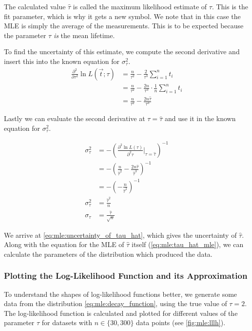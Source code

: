The calculated value \( \hat{\tau} \) is called the maximum likelihood estimate of \( \tau \). This is the fit parameter, which is why it gets a new symbol. We note that in this case the MLE is simply the average of the measurements. This is to be expected because the parameter \( \tau \) \emph{is} the mean lifetime.

To find the uncertainty of this estimate, we compute the second derivative and insert this into the known equation for $\sigma_\tau^2$.
\begin{align}
    \frac{\partial^2}{\partial \tau^2} \ln L(\vec{t} ; \tau) &= \frac{n}{\tau^2} - \frac{2}{\tau^3} \sum \limits_{i = 1}^{n} t_i \\
    &= \frac{n}{\tau^2} - \frac{2 n}{\tau^3} \cdot \frac{1}{n} \sum \limits_{i = 1}^{n} t_i \\
    &= \frac{n}{\tau^2} - \frac{2 n \hat{\tau}}{\tau^3}
\end{align}

Lastly we can evaluate the second derivative at $\tau = \hat{\tau}$ and use it in the known equation for $\sigma_\tau^2$.

\begin{align}
    \sigma_\tau^2 &= - \left(\frac{\partial^2 \ln L(\tau)}{\partial^2 \tau} \Big|_{\tau = \hat{\tau}} \right)^{-1} \\
    &= - \left( \frac{n}{\hat{\tau}^2} - \frac{2 n \hat{\tau}}{\hat{\tau}^3} \right)^{-1} \\
    &= - \left(- \frac{n}{\hat{\tau}^2} \right)^{-1} \\
    \sigma_\tau^2 &= \frac{\hat{\tau}^2}{n} \\
    \sigma_\tau &= \frac{\hat{\tau}}{\sqrt{n}}
    \label{eq:mle:uncertainty_of_tau_hat}
\end{align}

We arrive at \autoref{eq:mle:uncertainty_of_tau_hat}, which gives the uncertainty of \( \hat{\tau} \). Along with the equation for the MLE of \( \hat{\tau} \) itself (\autoref{eq:mle:tau_hat_mle}), we can calculate the parameters of the distribution which produced the data.

\subsubsection{Plotting the Log-Likelihood Function and its Approximation}

To understand the shapes of log-likelihood functions better, we generate some data from the distribution \autoref{eq:mle:decay_function}, using the true value of \( \tau = \num{2} \). The log-likelihood function is calculated and plotted for different values of the parameter \( \tau \) for datasets with \( n \in \{ 30, 300 \} \) data points (see \autoref{fig:mle:lllh}).

